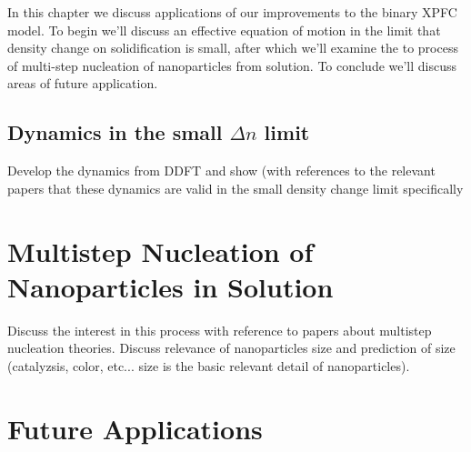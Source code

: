 \label{applications}

In this chapter we discuss applications of our improvements to the binary XPFC model.
To begin we'll discuss an effective equation of motion in the limit that density 
change on solidification is small, after which we'll examine the to process of
multi-step nucleation of nanoparticles from solution. To conclude we'll discuss
areas of future application.

\subsection{Dynamics in the small $\Delta n$ limit} %

{
    \color{ForestGreen} Develop the dynamics from DDFT and show (with references
    to the relevant papers that these dynamics are valid in the small density
    change limit specifically
}

\section{Multistep Nucleation of Nanoparticles in Solution} %

{
    \color{ForestGreen} Discuss the interest in this process with reference to 
    papers about multistep nucleation theories. Discuss relevance of nanoparticles
    size and prediction of size (catalyzsis, color, etc... size is the basic relevant
    detail of nanoparticles).
}

\section{Future Applications} %

